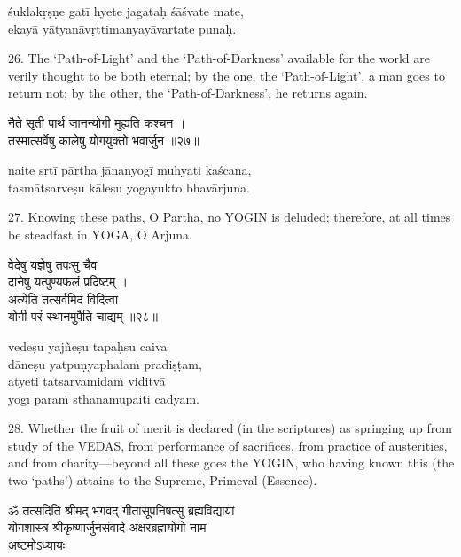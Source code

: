 \begin{transliteration}
śuklakṛṣṇe gatī hyete jagataḥ śāśvate mate, \\
ekayā yātyanāvṛttimanyayāvartate punaḥ.
\end{transliteration}

26. The `Path-of-Light' and the `Path-of-Darkness' available for the world are
verily thought to be both eternal; by the one, the `Path-of-Light', a man goes
to return not; by the other, the `Path-of-Darkness', he returns again.

\begin{gitaverse}
नैते सृती पार्थ जानन्योगी मुह्यति कश्चन । \\
तस्मात्सर्वेषु कालेषु योगयुक्तो भवार्जुन ॥२७॥
\end{gitaverse}

\begin{transliteration}
naite sṛtī pārtha jānanyogī muhyati kaścana, \\
tasmātsarveṣu kāleṣu yogayukto bhavārjuna.
\end{transliteration}

27. Knowing these paths, O Partha, no YOGIN is deluded; therefore, at all times
be steadfast in YOGA, O Arjuna.

\begin{gitaverse}
वेदेषु यज्ञेषु तपःसु चैव \\
\tab दानेषु यत्पुण्यफलं प्रदिष्टम् । \\
अत्येति तत्सर्वमिदं विदित्वा \\
\tab योगी परं स्थानमुपैति चाद्यम् ॥२८॥
\end{gitaverse}

\begin{transliteration}
vedeṣu yajñeṣu tapaḥsu caiva \\
\tab dāneṣu yatpuṇyaphalaṁ pradiṣṭam, \\
atyeti tatsarvamidaṁ viditvā \\
\tab yogī paraṁ sthānamupaiti cādyam.
\end{transliteration}

28. Whether the fruit of merit is declared (in the scriptures) as springing up
from study of the VEDAS, from performance of sacrifices, from practice of
austerities, and from charity---beyond all these goes the YOGIN, who having
known this (the two `paths') attains to the Supreme, Primeval (Essence).

\begin{gitaverse}
ॐ तत्सदिति श्रीमद् भगवद् गीतासूपनिषत्सु ब्रह्मविद्यायां \\
योगशास्त्र श्रीकृष्णार्जुनसंवादे अक्षरब्रह्मयोगो नाम \\
अष्टमोऽध्यायः
\end{gitaverse}

